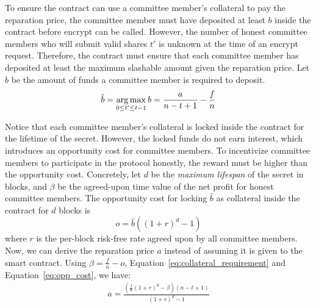 To ensure the contract can use a committee member's collateral to pay the reparation price, the committee member must have deposited at least $b$ inside the contract before \textsf{encrypt} can be called.
However, the number of honest committee members who will submit valid shares $t'$ is unknown at the time of an \textsf{encrypt} request.
Therefore, the contract must ensure that each committee member has deposited at least the maximum slashable amount given the reparation price.
Let $\hat{b}$ be the amount of funds a committee member is required to deposit.
\begin{equation}\label{eq:collateral_requirement}
    \hat{b} = \operatorname*{arg\,max}_{0 \leq t' \leq t - 1} b = \frac{a}{n - t + 1} - \frac{f}{n}
\end{equation}

Notice that each committee member's collateral is locked inside the contract for the lifetime of the secret.
However, the locked funds do not earn interest, which introduces an opportunity cost for committee members.
To incentivize committee members to participate in the protocol honestly, the reward must be higher than the opportunity cost.
Concretely, let $d$ be the \emph{maximum lifespan} of the secret in blocks, and $\beta$ be the agreed-upon time value of the net profit for honest committee members.
The opportunity cost for locking $\hat{b}$ as collateral inside the contract for $d$ blocks is
\begin{equation}\label{eq:opp_cost}
    o = \hat{b}((1 + r)^d - 1)
\end{equation}
where $r$ is the per-block risk-free rate agreed upon by all committee members.
Now, we can derive the reparation price $a$ instead of assuming it is given to the smart contract.
Using $\beta = \frac{f}{n} - o$, Equation~\ref{eq:collateral_requirement} and Equation~\ref{eq:opp_cost}, we have:
\begin{gather}\label{eq:collateral_from_holding_fee}
    a = \frac{(\frac{f}{n}(1 + r)^d - \beta)(n - t + 1)}{(1 + r)^d - 1}
\end{gather}

